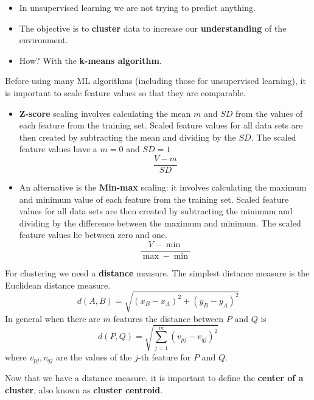 \begin{itemize}
    \item In unsupervised learning we are not trying to predict anything.
    \item The objective is to \textbf{cluster} data to increase our \textbf{understanding} of the environment.
    \item How? With the \textbf{k-means algorithm}.
\end{itemize}

Before using many ML algorithms (including those for unsupervised learning), it is important to scale feature values so that they are comparable.
\begin{itemize}
    \item \textbf{Z-score} scaling involves calculating the mean $m$ and $SD$ from the values of each feature from the training set. Scaled feature values for all data sets are then created by subtracting the mean and dividing by the $SD$. The scaled feature values have a $m=0$ and $SD=1$
          \begin{equation*}
              \frac{V-m}{SD}
          \end{equation*}
    \item An alternative is the \textbf{Min-max} scaling: it involves calculating the maximum and minimum value of each feature from the training set. Scaled feature values for all data sets are then created by subtracting the minimum and dividing by the difference between the maximum and minimum. The scaled feature values lie between zero and one.
          \begin{equation*}
              \frac{V-\min}{\max -\min}
          \end{equation*}
\end{itemize}

For clustering we need a \textbf{distance} measure. The simplest distance measure is the Euclidean distance measure.
\begin{equation*}
    d\left( A,B\right) =\sqrt{\left( x_{B} -x_{A}\right)^{2} +\left( y_{B} -y_{A}\right)^{2}}
\end{equation*}
In general when there are $m$ features the distance between $P$ and $Q$ is
\begin{equation*}
    d\left( P,Q\right) =\sqrt{\sum\limits _{j=1}^{m}\left( v_{pj} -v_{qj}\right)^{2}}
\end{equation*}
where $v_{pj} ,v_{qj}$ are the values of the $j$-th feature for $P$ and $Q$.

Now that we have a distance measure, it is important to define the \textbf{center of a cluster}, also known as \textbf{cluster centroid}.


